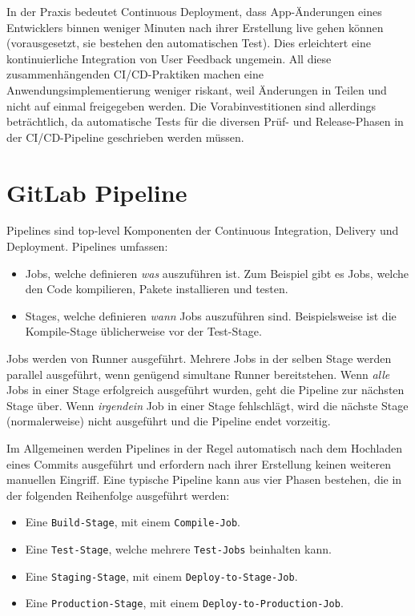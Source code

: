 In der Praxis bedeutet Continuous Deployment, dass App-Änderungen eines Entwicklers binnen weniger Minuten nach ihrer Erstellung live gehen können (vorausgesetzt, sie bestehen den automatischen Test). Dies erleichtert eine kontinuierliche Integration von User Feedback ungemein. All diese zusammenhängenden CI/CD-Praktiken machen eine Anwendungsimplementierung weniger riskant, weil Änderungen in Teilen und nicht auf einmal freigegeben werden. Die Vorabinvestitionen sind allerdings beträchtlich, da automatische Tests für die diversen Prüf- und Release-Phasen in der CI/CD-Pipeline geschrieben werden müssen.\autocite{whatIsCICD}

\section{GitLab Pipeline}

Pipelines sind top-level Komponenten der Continuous Integration, Delivery und Deployment. Pipelines umfassen:\autocite{gitlabPipelines}

\begin{itemize}
	\item Jobs, welche definieren \textit{was} auszuführen ist. Zum Beispiel gibt es Jobs, welche den Code kompilieren, Pakete installieren und testen.
	\item Stages, welche definieren \textit{wann} Jobs auszuführen sind. Beispielsweise ist die Kompile-Stage üblicherweise vor der Test-Stage.
\end{itemize}

Jobs werden von Runner ausgeführt. Mehrere Jobs in der selben Stage werden parallel ausgeführt, wenn genügend simultane Runner bereitstehen.
Wenn \textit{alle} Jobs in einer Stage erfolgreich ausgeführt wurden, geht die Pipeline zur nächsten Stage über.
Wenn \textit{irgendein} Job in einer Stage fehlschlägt, wird die nächste Stage (normalerweise) nicht ausgeführt und die Pipeline endet vorzeitig.\autocite{gitlabPipelines}

Im Allgemeinen werden Pipelines in der Regel automatisch  nach dem Hochladen eines Commits ausgeführt und erfordern nach ihrer Erstellung keinen weiteren manuellen Eingriff.
Eine typische Pipeline kann aus vier Phasen bestehen, die in der folgenden Reihenfolge ausgeführt werden:\autocite{gitlabPipelines}

\begin{itemize}
	\item Eine \texttt{Build-Stage}, mit einem \texttt{Compile-Job}.
	\item Eine \texttt{Test-Stage}, welche mehrere \texttt{Test-Jobs} beinhalten kann.
	\item Eine \texttt{Staging-Stage}, mit einem \texttt{Deploy-to-Stage-Job}.
	\item Eine \texttt{Production-Stage}, mit einem \texttt{Deploy-to-Production-Job}.
\end{itemize}

